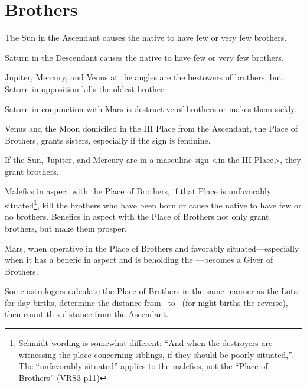 \section{Brothers}

The Sun in the Ascendant causes the native to have few or very few brothers. 

Saturn in the Descendant causes the native to have few or very few brothers. 

Jupiter, Mercury, and Venus at the angles are the bestowers of brothers, but Saturn in opposition kills the oldest brother. 

Saturn in conjunction with Mars is destructive of brothers or makes them sickly. 

Venus and the Moon domiciled in the III Place from the Ascendant, the Place of Brothers, grants sisters, especially if the sign is feminine. 

If the Sun, Jupiter, and Mercury are in a masculine sign <in the III Place>, they grant brothers. 

Malefics in aspect with the Place of Brothers, if that Place is unfavorably situated\footnote{Schmidt wording is somewhat different: ``And when the destroyers are witnessing the place concerning siblings, if they should be poorly situated,''. The ``unfavorably situated'' applies to the malefics, not the ``Place of Brothers'' (VRS3 p11)}, kill the brothers who have been born or cause the native to have few or no brothers. Benefics in aspect with the Place of Brothers not only grant brothers, but make them prosper. 

Mars, when operative in the Place of Brothers and favorably situated—especially when it has a benefic in aspect and is beholding the \Moon—becomes a Giver of Brothers.

Some astrologers calculate the Place of Brothers in the same manner as the Lots: for day births, determine the distance from \Saturn\, to \Jupiter\, (for night births the reverse), then count this distance from the Ascendant.

\newpage